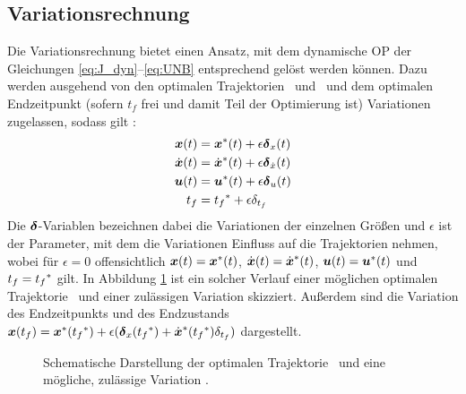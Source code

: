 \subsection{Variationsrechnung}\label{subsec:Variationsrechnung}
Die Variationsrechnung bietet einen Ansatz, mit dem dynamische \gls{OP} der Gleichungen \eqref{eq:J_dyn}--\eqref{eq:UNB} entsprechend gelöst werden können. Dazu werden ausgehend von den optimalen Trajektorien \xoptoft~und \uoptoft~und dem optimalen Endzeitpunkt  (sofern $t_f$ frei und damit Teil der Optimierung ist) Variationen zugelassen, sodass gilt \cite{KnutGraichen.2012}:
\begin{align}
\boldsymbol{x}(t) &= {\boldsymbol{x}}^*(t) + \epsilon\boldsymbol{\delta}_{x}(t) \label{eq:x_var}\\
\dot{\boldsymbol{x}}(t) &= \dot{\boldsymbol{x}}^*(t) + \epsilon\boldsymbol{\delta}_{\dot{x}}(t) \label{eq:dx_var}\\
\boldsymbol{u}(t) &= {\boldsymbol{u}}^*(t) + \epsilon\boldsymbol{\delta}_{u}(t) \label{eq:u_var}\\
t_f &= {t_f}^* + \epsilon\delta_{t_f}\label{eq:t_var}
\end{align}
Die $\boldsymbol{\delta}$-Variablen bezeichnen dabei die Variationen der einzelnen Größen und $\epsilon$ ist der Parameter, mit dem die Variationen Einfluss auf die Trajektorien nehmen, wobei für $\epsilon=0$ offensichtlich $\boldsymbol{x}(t)={\boldsymbol{x}}^*(t)$, $\dot{\boldsymbol{x}}(t) = \dot{\boldsymbol{x}}^*(t)$, $\boldsymbol{u}(t)={\boldsymbol{u}}^*(t)$ und $t_f={t_f}^*$ gilt. In Abbildung \ref{fig:Variation} ist ein solcher Verlauf einer möglichen optimalen Trajektorie \xoptoft~und einer zulässigen Variation skizziert. Außerdem sind die Variation des Endzeitpunkts und des Endzustands $\boldsymbol{x}(t_f) = {\boldsymbol{x}}^*({t_f}^*)+\epsilon(\boldsymbol{\delta}_{x}({t_f}^*)+\dot{\boldsymbol{x}}^*({t_f}^*)\delta_{t_f})$ dargestellt.
\begin{figure}[h]
\centering
{}
\caption{Schematische Darstellung der optimalen Trajektorie \xoptoft~und eine mögliche, zulässige Variation \xoft.}
\label{fig:Variation}
\end{figure}


